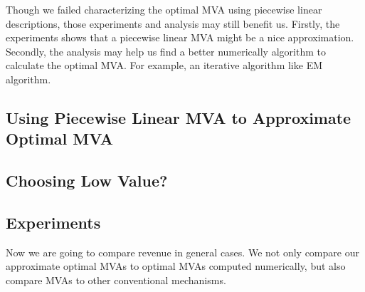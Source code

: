 Though we failed characterizing the optimal MVA using piecewise linear
descriptions, those experiments and analysis may still benefit us. Firstly, the
experiments shows that a piecewise linear MVA might be a nice approximation.
Secondly, the analysis may help us find a better numerically algorithm to
calculate the optimal MVA. For example, an iterative algorithm like EM
algorithm.

\subsection{Using Piecewise Linear MVA to Approximate Optimal MVA}

\subsection{Choosing Low Value?}

\subsection{Experiments}

Now we are going to compare revenue in general cases. We not only compare our
approximate optimal MVAs to optimal MVAs computed numerically, but also compare
MVAs to other conventional mechanisms.


